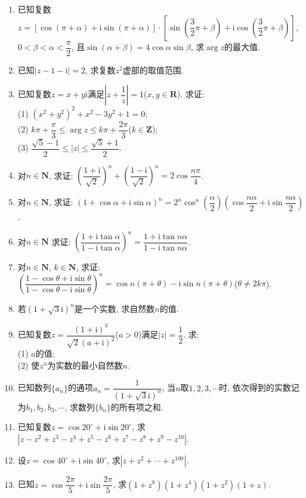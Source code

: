 \documentclass[10pt,a4paper]{article}
\begin{document}
\begin{enumerate}[1.]
\item 已知复数$z=[\cos (\pi +\alpha)+\mathrm{i}\sin (\pi +\alpha)]\cdot [\sin (\dfrac 32\pi +\beta)+\mathrm{i}\cos (\dfrac 32\pi +\beta)]$, $0<\beta <\alpha <\dfrac{\pi }2$, 且$\sin (\alpha +\beta)=4\cos \alpha \sin \beta$, 求$\arg z$的最大值.
\item 已知$|z-1-\mathrm{i}|=2$, 求复数$z^2$虚部的取值范围.
\item 已知复数$z=x+y\mathrm{i}$满足$|z+\dfrac 1z|=1$($x,y\in \mathbf{R}$). 求证:\\
(1) $(x^2+y^2)^2+x^2-3y^2+1=0$;\\
(2) $k\pi +\dfrac{\pi }3\le \arg z\le k\pi +\dfrac{2\pi }3$($k\in \mathbf{Z}$);\\
(3) $\dfrac{\sqrt 5-1}2\le|z|\le \dfrac{\sqrt 5+1}2$.
\item 对$n\in \mathbf{N}$, 求证: $(\dfrac{1+\mathrm{i}}{\sqrt 2})^n+(\dfrac{1-\mathrm{i}}{\sqrt 2})^n=2\cos \dfrac{n\pi }4$.
\item 对$n\in \mathbf{N}$, 求证: $(1+\cos \alpha +\mathrm{i}\sin \alpha)^n=2^n\cos ^n(\dfrac{\alpha }2)(\cos \dfrac{n\alpha }2+\mathrm{i}\sin \dfrac{n\alpha }2)$.
\item 对$n\in \mathbf{N}$ 求证: $(\dfrac{1+\mathrm{i}\tan \alpha }{1-\mathrm{i}\tan \alpha })^n=\dfrac{1+\mathrm{i}\tan n\alpha }{1-\mathrm{i}\tan n\alpha }$.
\item 对$n\in \mathbf{N}$, $k\in \mathbf{N}$, 求证: $(\dfrac{1-\cos \theta +\mathrm{i}\sin \theta }{1-\cos \theta -\mathrm{i}\sin \theta })^n=\cos n(\pi +\theta)-\mathrm{i}\sin n(\pi +\theta)$($\theta \ne 2k\pi$).
\item 若$(1+\sqrt 3\mathrm{i})^n$是一个实数, 求自然数$n$的值.
\item 已知复数$z=\dfrac{{{(1+\mathrm{i})}^3}}{\sqrt 2{{(a+\mathrm{i})}^2}}$($a>0$)满足$|z|=\dfrac 12$. 求:\\
(1) $a$的值;\\							
(2) 使$z^n$为实数的最小自然数$n$.
\item 已知数列$\{a_n\}$的通项$a_n=\dfrac 1{(1+\sqrt 3\mathrm{i})^n}$, 当$n$取$1,2,3,\cdots$时, 依次得到的实数记为$b_1,b_2,b_3,\cdots$, 求数列$\{b_n\}$的所有项之和.
\item 已知复数$z=\cos 20^\circ +\mathrm{i}\sin 20^\circ$, 求$|z-z^2+z^3-z^4+z^5-z^6+z^7-z^8+z^9-z^{10}|$.
\item 设$z=\cos 40^\circ +\mathrm{i}\sin 40^\circ$, 求$|z+z^2+\cdots +z^{100}|$.
\item 已知$z=\cos \dfrac{2\pi }5+\mathrm{i}\sin \dfrac{2\pi }5$, 求$(1+z^8)(1+z^4)(1+z^2)(1+z)$.

\end{enumerate}
\end{document}
